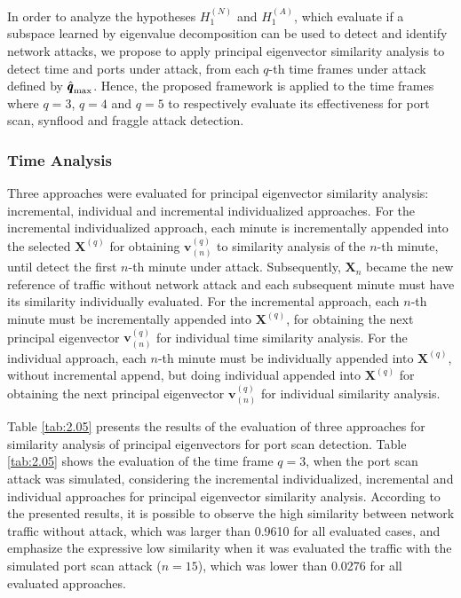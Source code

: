 In order to analyze the hypotheses $H_1^{(N)}$ and $H_1^{(A)}$, which evaluate if a subspace learned by eigenvalue decomposition can be used to detect and identify network attacks, we propose to apply principal eigenvector similarity analysis to detect time and ports under attack, from each $q$-th time frames under attack defined by $\rm{\hat{\pmb{q}}}_{\rm max}$. Hence, the proposed framework is applied to the time frames where $q=3$, $q=4$ and $q=5$ to respectively evaluate its effectiveness for port scan, synflood and fraggle attack detection.

\subsubsection{Time Analysis}
\label{sec:2_TimeAnalysis}

Three approaches were evaluated for principal eigenvector similarity analysis: incremental, individual and incremental individualized approaches. For the incremental individualized approach, each minute is incrementally appended into the selected $\pmb{X}^{(q)}$ for obtaining $\pmb{v}_{(n)}^{(q)}$ to similarity analysis of the $n$-th minute, until detect the first $n$-th minute under attack. Subsequently, $\pmb{X}_n$ became the new reference of traffic without network attack and each subsequent minute must have its similarity individually evaluated. For the incremental approach, each $n$-th minute must be incrementally appended into $\pmb{X}^{(q)}$, for obtaining the next principal eigenvector $\pmb{v}_{(n)}^{(q)}$ for individual time similarity analysis. For the individual approach, each $n$-th minute must be individually appended into $\pmb{X}^{(q)}$, without incremental append, but doing individual appended into $\pmb{X}^{(q)}$ for obtaining the next principal eigenvector $\pmb{v}_{(n)}^{(q)}$ for individual similarity analysis.

Table \ref{tab:2.05} presents the results of the evaluation of three approaches for similarity analysis of principal eigenvectors for port scan detection. Table \ref{tab:2.05} shows the evaluation of the time frame $q=3$, when the port scan attack was simulated, considering the incremental individualized, incremental and individual approaches for principal eigenvector similarity analysis. According to the presented results, it is possible to observe the high similarity between network traffic without attack, which was larger than 0.9610 for all evaluated cases, and emphasize the expressive low similarity when it was evaluated the traffic with the simulated port scan attack ($n=15$), which was lower than 0.0276 for all evaluated approaches.

